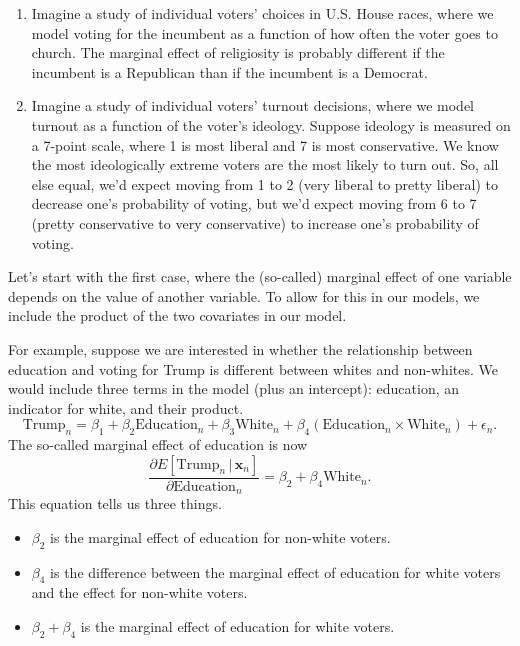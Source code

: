 \documentclass[
  12pt,
  oneside,openany]{book}
\begin{document}
\begin{enumerate}
\def\labelenumi{\arabic{enumi}.}
\item
  Imagine a study of individual voters' choices in U.S. House races, where we model voting for the incumbent as a function of how often the voter goes to church. The marginal effect of religiosity is probably different if the incumbent is a Republican than if the incumbent is a Democrat.
\item
  Imagine a study of individual voters' turnout decisions, where we model turnout as a function of the voter's ideology. Suppose ideology is measured on a 7-point scale, where 1 is most liberal and 7 is most conservative. We know the most ideologically extreme voters are the most likely to turn out. So, all else equal, we'd expect moving from 1 to 2 (very liberal to pretty liberal) to decrease one's probability of voting, but we'd expect moving from 6 to 7 (pretty conservative to very conservative) to increase one's probability of voting.
\end{enumerate}

Let's start with the first case, where the (so-called) marginal effect of one variable depends on the value of another variable. To allow for this in our models, we include the product of the two covariates in our model.

For example, suppose we are interested in whether the relationship between education and voting for Trump is different between whites and non-whites. We would include three terms in the model (plus an intercept): education, an indicator for white, and their product.
\[
\text{Trump}_n = \beta_1 + \beta_2 \text{Education}_n + \beta_3 \text{White}_n + \beta_4 (\text{Education}_n \times \text{White}_n) + \epsilon_n.
\]
The so-called marginal effect of education is now
\[
\frac{\partial{}E[\text{Trump}_n \,|\, \mathbf{x}_n]}{\partial{}\text{Education}_n}
= \beta_2 + \beta_4 \text{White}_n.
\]
This equation tells us three things.

\begin{itemize}
\item
  \(\beta_2\) is the marginal effect of education for non-white voters.
\item
  \(\beta_4\) is the difference between the marginal effect of education for white voters and the effect for non-white voters.
\item
  \(\beta_2 + \beta_4\) is the marginal effect of education for white voters.
\end{itemize}
\end{document}
